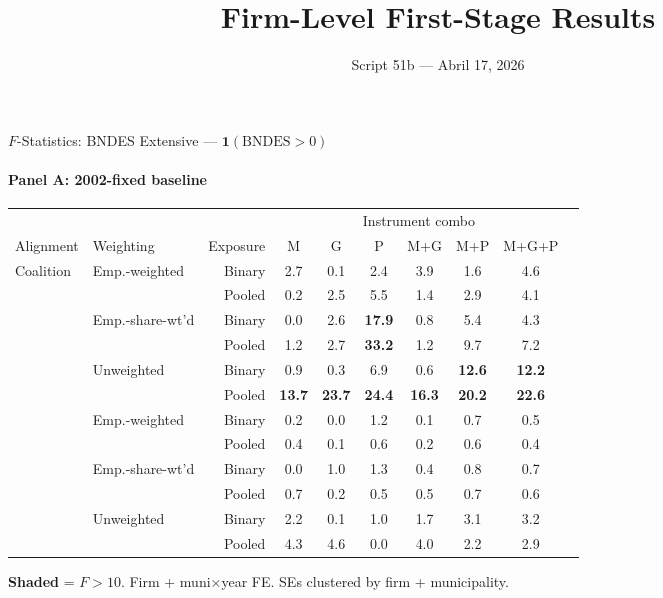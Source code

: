 \documentclass[aspectratio=169,10pt]{beamer}
\title{Firm-Level First-Stage Results}
\subtitle{Script 51b --- Abril 17, 2026}
\author{}
\date{}
\newcommand{\fpass}[1]{\cellcolor{pass}\textbf{#1}}
\begin{document}
\begin{frame}
\titlepage
\end{frame}


\begin{frame}[t]{$F$-Statistics: BNDES Extensive --- $\mathbf{1}(\text{BNDES}>0)$}
\framesubtitle{Panel A: 2002-fixed baseline}
\begin{center}
\footnotesize
\setlength{\tabcolsep}{3.5pt}
\renewcommand{\arraystretch}{1.05}
\begin{tabular}{@{}llrccccccc@{}}
\toprule
 & & & \multicolumn{6}{c}{Instrument combo} \\
\cmidrule(l{2pt}r{2pt}){4-9}
Alignment & Weighting & Exposure & M & G & P & M+G & M+P & M+G+P \\
\midrule
  \multirow{6}{*}{Coalition} & \multirow{2}{*}{Emp.-weighted} & Binary & 2.7 & 0.1 & 2.4 & 3.9 & 1.6 & 4.6 \\
   &  & Pooled & 0.2 & 2.5 & 5.5 & 1.4 & 2.9 & 4.1 \\
   & \multirow{2}{*}{Emp.-share-wt'd} & Binary & 0.0 & 2.6 & \fpass{17.9} & 0.8 & 5.4 & 4.3 \\
   &  & Pooled & 1.2 & 2.7 & \fpass{33.2} & 1.2 & 9.7 & 7.2 \\
   & \multirow{2}{*}{Unweighted} & Binary & 0.9 & 0.3 & 6.9 & 0.6 & \fpass{12.6} & \fpass{12.2} \\
   &  & Pooled & \fpass{13.7} & \fpass{23.7} & \fpass{24.4} & \fpass{16.3} & \fpass{20.2} & \fpass{22.6} \\
\addlinespace[5pt]
  \multirow{6}{*}{Party} & \multirow{2}{*}{Emp.-weighted} & Binary & 0.2 & 0.0 & 1.2 & 0.1 & 0.7 & 0.5 \\
   &  & Pooled & 0.4 & 0.1 & 0.6 & 0.2 & 0.6 & 0.4 \\
   & \multirow{2}{*}{Emp.-share-wt'd} & Binary & 0.0 & 1.0 & 1.3 & 0.4 & 0.8 & 0.7 \\
   &  & Pooled & 0.7 & 0.2 & 0.5 & 0.5 & 0.7 & 0.6 \\
   & \multirow{2}{*}{Unweighted} & Binary & 2.2 & 0.1 & 1.0 & 1.7 & 3.1 & 3.2 \\
   &  & Pooled & 4.3 & 4.6 & 0.0 & 4.0 & 2.2 & 2.9 \\
\bottomrule
\end{tabular}
\end{center}
{\scriptsize \colorbox{pass}{\textbf{Shaded}} = $F>10$. Firm + muni$\times$year FE. SEs clustered by firm + municipality.}
\end{frame}
\end{document}
